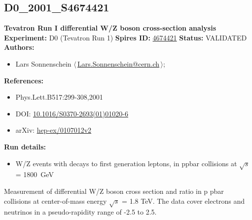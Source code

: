 \subsection[D0\_2001\_S4674421]{D0\_2001\_S4674421\,\cite{Abazov:2001nta}}
\textbf{Tevatron Run I differential W/Z boson cross-section analysis}\newline
\textbf{Experiment:} D0 (Tevatron Run 1) \newline
\textbf{Spires ID:} \href{http://www.slac.stanford.edu/spires/find/hep/www?rawcmd=key+4674421}{4674421}\newline
\textbf{Status:} VALIDATED\newline
\textbf{Authors:}
\begin{itemize}
  \item Lars Sonnenschein $\langle\,$\href{mailto:Lars.Sonnenschein@cern.ch}{Lars.Sonnenschein@cern.ch}$\,\rangle$;
\end{itemize}
\textbf{References:}
\begin{itemize}
  \item Phys.Lett.B517:299-308,2001
  \item DOI: \href{http://dx.doi.org/10.1016/S0370-2693(01)01020-6}{10.1016/S0370-2693(01)01020-6}
  \item arXiv: \href{http://arxiv.org/abs/hep-ex/0107012v2}{hep-ex/0107012v2}
\end{itemize}
\textbf{Run details:}
\begin{itemize}

  \item W/Z events with decays to first generation leptons, in ppbar collisions at \ensuremath{\sqrt{s}} = 1800~GeV\end{itemize}

\noindent Measurement of differential W/Z boson cross section and ratio in p pbar collisions at center-of-mass energy \ensuremath{\sqrt{s}} = 1.8 TeV. The data cover electrons and neutrinos in a pseudo-rapidity range of -2.5 to 2.5.

\clearpage


\clearpage

